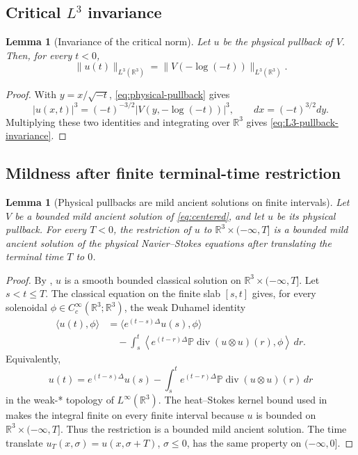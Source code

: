 \documentclass[11pt]{amsart}
\theoremstyle{plain}
\newtheorem{lemma}[theorem]{Lemma}
\theoremstyle{definition}
\theoremstyle{remark}
\numberwithin{equation}{section}
\newcommand{\R}{\mathbb R}
\newcommand{\divergence}{\operatorname{div}}
\begin{document}
\subsection{\texorpdfstring{Critical \(L^3\) invariance}{Critical L3 invariance}}

\begin{lemma}[Invariance of the critical norm]
\label{lem:L3-pullback-invariance}
Let \(u\) be the physical pullback of \(V\).  Then, for every \(t<0\),
\begin{equation}\label{eq:L3-pullback-invariance}
   \|u(t)\|_{L^3(\R^3)}
   =
   \|V(-\log(-t))\|_{L^3(\R^3)} .
\end{equation}
\end{lemma}

\begin{proof}
With \(y=x/\sqrt{-t}\), \eqref{eq:physical-pullback} gives
\[
   |u(x,t)|^3=(-t)^{-3/2}|V(y,-\log(-t))|^3,
   \qquad
   dx=(-t)^{3/2}dy .
\]
Multiplying these two identities and integrating over \(\R^3\) gives
\eqref{eq:L3-pullback-invariance}.
\end{proof}

\subsection{Mildness after finite terminal-time restriction}

\begin{lemma}[Physical pullbacks are mild ancient solutions on finite intervals]
\label{lem:physical-mild}
Let \(V\) be a bounded mild ancient solution of \eqref{eq:centered}, and let
\(u\) be its physical pullback.  For every \(T<0\), the restriction of \(u\)
to \(\R^3\times(-\infty,T]\) is a bounded mild ancient solution of the
physical Navier--Stokes equations after translating the terminal time \(T\) to
\(0\).
\end{lemma}

\begin{proof}
By , \(u\) is a smooth bounded classical solution
on \(\R^3\times(-\infty,T]\).  Let \(s<t\le T\).  The classical equation on
the finite slab \([s,t]\) gives, for every solenoidal
\(\phi\in C_c^\infty(\R^3;\R^3)\), the weak Duhamel identity
\[
\begin{aligned}
   \langle u(t),\phi\rangle
   &=
   \langle e^{(t-s)\Delta}u(s),\phi\rangle \\
   &\quad
   -
   \int_s^t
   \left\langle
      e^{(t-r)\Delta}\mathbb P\divergence(u\otimes u)(r),
      \phi
   \right\rangle\,dr .
\end{aligned}
\]
Equivalently,
\[
   u(t)
   =
   e^{(t-s)\Delta}u(s)
   -
   \int_s^t
   e^{(t-r)\Delta}\mathbb P\divergence(u\otimes u)(r)\,dr
\]
in the weak-* topology of \(L^\infty(\R^3)\).  The heat--Stokes kernel bound
used in  makes the integral finite on every
finite interval because \(u\) is bounded on
\(\R^3\times(-\infty,T]\).  Thus the restriction is a bounded mild ancient
solution.  The time translate \(u_T(x,\sigma)=u(x,\sigma+T)\),
\(\sigma\le0\), has the same property on \((-\infty,0]\).
\end{proof}
\end{document}
